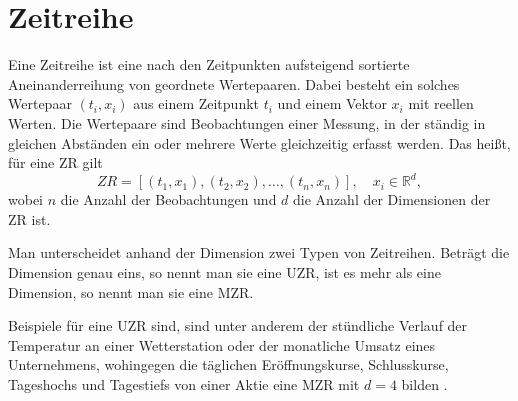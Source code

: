 \section{Zeitreihe}
Eine Zeitreihe ist eine nach den Zeitpunkten aufsteigend sortierte Aneinanderreihung von geordnete Wertepaaren. Dabei besteht ein solches Wertepaar $(t_i, x_i)$ aus einem Zeitpunkt $t_i$ und einem Vektor $x_i$ mit reellen Werten. Die Wertepaare sind Beobachtungen einer Messung, in der ständig in gleichen Abständen ein oder mehrere Werte gleichzeitig erfasst werden. Das heißt, für eine \ac{ZR} gilt 
\begin{equation}
    ZR=[(t_1,x_1),(t_2,x_2),\ldots,(t_n,x_n)], \quad x_i \in \mathbb{R}^d,
\end{equation}
wobei $n$ die Anzahl der Beobachtungen und $d$ die Anzahl der Dimensionen der \acs{ZR} ist. 

Man unterscheidet anhand der Dimension zwei Typen von Zeitreihen. Beträgt die Dimension genau eins, so nennt man sie eine \ac{UZR}, ist es mehr als eine Dimension, so nennt man sie eine \ac{MZR}.

Beispiele für eine \acs{UZR} sind, sind unter anderem der stündliche Verlauf der Temperatur an einer Wetterstation oder der monatliche Umsatz eines Unternehmens, wohingegen die täglichen Eröffnungskurse, Schlusskurse, Tageshochs und Tagestiefs von einer Aktie eine \acs{MZR} mit $d=4$ bilden \cite[Ch. 3.1]{gc2023}.